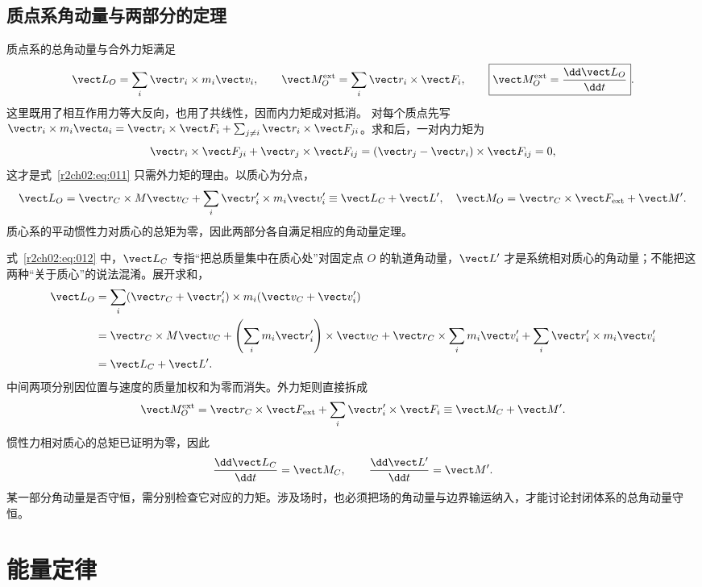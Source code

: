 \subsection{质点系角动量与两部分的定理}
\label{r2ch02:sec:system-angular}

质点系的总角动量与合外力矩满足
\begin{equation}
 \vect L_O=\sum_i\vect r_i\times m_i\vect v_i,\qquad
 \vect M_O^{\rm ext}=\sum_i\vect r_i\times\vect F_i,\qquad
 \boxed{\vect M_O^{\rm ext}=\frac{\dd\vect L_O}{\dd t}}.
 \label{r2ch02:eq:011}
\end{equation}
这里既用了相互作用力等大反向，也用了共线性，因而内力矩成对抵消。
对每个质点先写 $\vect r_i\times m_i\vect a_i=\vect r_i\times\vect F_i+\sum_{j\ne i}\vect r_i\times\vect F_{ji}$。求和后，一对内力矩为
\[
 \vect r_i\times\vect F_{ji}+\vect r_j\times\vect F_{ij}
 =(\vect r_j-\vect r_i)\times\vect F_{ij}=0,
\]
这才是式~\eqref{r2ch02:eq:011} 只需外力矩的理由。以质心为分点，
\begin{equation}
 \vect L_O=\vect r_C\times M\vect v_C
 +\sum_i\vect r_i'\times m_i\vect v_i'
 \equiv \vect L_C+\vect L',
 \quad
 \vect M_O=\vect r_C\times\vect F_{\rm ext}+\vect M'.
 \label{r2ch02:eq:012}
\end{equation}
质心系的平动惯性力对质心的总矩为零，因此两部分各自满足相应的角动量定理。

式~\eqref{r2ch02:eq:012} 中，$\vect L_C$ 专指“把总质量集中在质心处”对固定点 $O$ 的轨道角动量，$\vect L'$ 才是系统相对质心的角动量；不能把这两种“关于质心”的说法混淆。展开求和，
\[
\begin{aligned}
 \vect L_O
 &=\sum_i(\vect r_C+\vect r_i')\times m_i(\vect v_C+\vect v_i')\\
 &=\vect r_C\times M\vect v_C
   +\left(\sum_i m_i\vect r_i'\right)\times\vect v_C
   +\vect r_C\times\sum_i m_i\vect v_i'
   +\sum_i\vect r_i'\times m_i\vect v_i'\\
 &=\vect L_C+\vect L'.
\end{aligned}
\]
中间两项分别因位置与速度的质量加权和为零而消失。外力矩则直接拆成
\[
 \vect M_O^{\rm ext}=\vect r_C\times\vect F_{\rm ext}
 +\sum_i\vect r_i'\times\vect F_i
 \equiv\vect M_C+\vect M'.
\]
惯性力相对质心的总矩已证明为零，因此
\[
 \frac{\dd\vect L_C}{\dd t}=\vect M_C,\qquad
 \frac{\dd\vect L'}{\dd t}=\vect M'.
\]
某一部分角动量是否守恒，需分别检查它对应的力矩。涉及场时，也必须把场的角动量与边界输运纳入，才能讨论封闭体系的总角动量守恒。

\section{能量定律}
\label{r2ch02:sec:energy}

